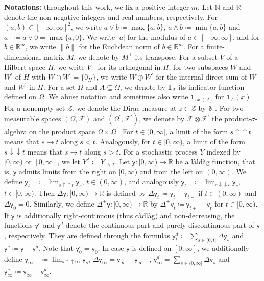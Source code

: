 \documentclass[10pt]{article} %
\newcommand\cF{\mathcal F}
\newcommand\cZ{\mathcal Z}
\def \N{\mathbb{N}}
\def \R{\mathbb{R}}
\begin{document}
\medskip
{\small\textbf{Notations:} {throughout this work, we fix a positive integer $m$. Let $\N$ and $\R$ denote the non-negative integers and real numbers, respectively. For $(a,b) \in [-\infty,\infty]^2$, we write $a \lor b \coloneqq \max\{a,b\}$, $a \land b \coloneqq \min\{a,b\}$ and $a^+ \coloneqq a \lor 0 = \max\{a,0\}$. We write $|a|$ for the modulus of $a \in [-\infty,\infty]$, and for $b \in \R^m$, we write $\|b\|$ for the Euclidean norm of $b \in \R^m$. For a finite-dimensional matrix $M$, we denote by $M^\top$ its transpose. For a subset $V$ of a Hilbert space $H$, we write $V^\perp$ for its orthogonal in $H$; for two subspaces $W$ and $W^\prime$ of $H$ with $W \cap W^\prime = \{0_H\}$, we write $W \oplus W^\prime$ for the internal direct sum of $W$ and $W^\prime$ in $H$.  For a set $\Omega$ and $A \subseteq \Omega$, we denote by $\mathbf{1}_A$ its indicator function defined on $\Omega$. We abuse notation and sometimes also write $\mathbf{1}_{\{x \in A\}}$ for $\mathbf{1}_{A}(x)$. For a nonempty set $\cZ$, we denote the Dirac-measure at $z \in \cZ$ by $\boldsymbol{\delta}_z$. For two measurable spaces $(\Omega,\cF)$ and $(\Omega^\prime,\cF^\prime)$, we denote by $\cF \otimes \cF^\prime$ the product-$\sigma$-algebra on the product space $\Omega \times \Omega^\prime$. For $t \in (0,\infty]$, a limit of the form $s \uparrow\uparrow t$ means that $s \rightarrow t$ along $s < t$. Analogously, for $t \in [0,\infty)$, a limit of the form $s \downarrow\downarrow t$ means that $s \rightarrow t$ along $s > t$. For a stochastic process $Y$ indexed by $[0,\infty)$ or $[0,\infty]$, we let $Y^T \coloneqq Y_{\cdot \land T}$.  Let $\mathsf{y} : [0,\infty) \rightarrow \R$ be a l\`ald\`ag function, that is, $\mathsf{y}$ admits limits from the right on $[0,\infty)$ and from the left on $(0,\infty)$. We define $\mathsf{y}_{t-} \coloneqq \lim_{s \uparrow\uparrow t} \mathsf{y}_s$, $t \in (0,\infty)$, and analogously $\mathsf{y}_{t+} \coloneqq \lim_{s \downarrow\downarrow t} \mathsf{y}_s$, $t \in [0,\infty)$. Then $\Delta \mathsf{y} : [0,\infty) \rightarrow \R$ is defined by $\Delta \mathsf{y}_t \coloneqq \mathsf{y}_t - \mathsf{y}_{t-}$ if $t \in (0,\infty)$ and $\Delta\mathsf{y}_0 = 0$. Similarly, we define $\Delta^+ \mathsf{y} : [0,\infty) \rightarrow \R$ by $\Delta^+ \mathsf{y}_t \coloneqq \mathsf{y}_{t+} - \mathsf{y}_t$ for $t \in [0,\infty)$. If $\mathsf{y}$ is additionally right-continuous (thus c\`adl\`ag) and non-decreasing, the functions $\mathsf{y}^c$ and $\mathsf{y}^d$ denote the continuous part and purely discontinuous part of $\mathsf{y}$, respectively. They are defined through the formulas $\mathsf{y}^d_t \coloneqq \sum_{s \in (0,t]} \Delta\mathsf{y}_s$ and $\mathsf{y}^c \coloneqq \mathsf{y} - \mathsf{y}^d$. Note that $\mathsf{y}^c_0 = \mathsf{y}_0$. In case $\mathsf{y}$ is defined on $[0,\infty]$, we additionally define $\mathsf{y}_{\infty-} \coloneqq \lim_{s \uparrow\uparrow \infty}\mathsf{y}_s$, $\Delta \mathsf{y}_\infty = \mathsf{y}_\infty - \mathsf{y}_{\infty-}$, $\mathsf{y}^d_{\infty} = \sum_{s \in (0,\infty]} \Delta \mathsf{y}_s$ and $\mathsf{y}^c_\infty \coloneqq \mathsf{y}_\infty - \mathsf{y}^d_\infty$.}}
\end{document}

